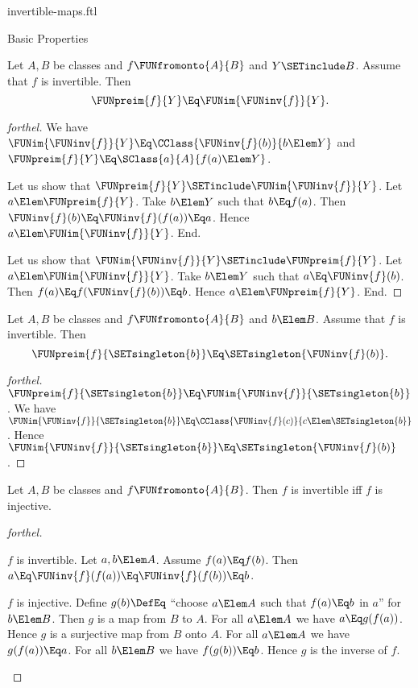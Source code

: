 \documentclass{stex}
\begin{document}
\begin{smodule}{invertible-maps.ftl}
\begin{sfragment}{Basic Properties}
  \begin{proposition}[forthel]
    Let $A, B$ be classes and $f \FUNfromonto{A}{B}$ and $Y \SETinclude B$.
    Assume that $f$ is invertible.
    Then \[ \FUNpreim{f}{Y} \Eq \FUNim{\FUNinv{f}}{Y}. \]
  \end{proposition}
  \begin{proof}[forthel]
    We have $\FUNim{\FUNinv{f}}{Y} \Eq \CClass{\FUNinv{f}(b)}{b \Elem Y}$ and $\FUNpreim{f}{Y} \Eq \SClass{a}{A}{f(a) \Elem Y}$.

    Let us show that $\FUNpreim{f}{Y} \SETinclude \FUNim{\FUNinv{f}}{Y}$.
      Let $a \Elem \FUNpreim{f}{Y}$.
      Take $b \Elem Y$ such that $b \Eq f(a)$.
      Then $\FUNinv{f}(b) \Eq \FUNinv{f}(f(a)) \Eq a$.
      Hence $a \Elem \FUNim{\FUNinv{f}}{Y}$.
    End.

    Let us show that $\FUNim{\FUNinv{f}}{Y} \SETinclude \FUNpreim{f}{Y}$.
      Let $a \Elem \FUNim{\FUNinv{f}}{Y}$.
      Take $b \Elem Y$ such that $a \Eq \FUNinv{f}(b)$.
      Then $f(a) \Eq f(\FUNinv{f}(b)) \Eq b$.
      Hence $a \Elem \FUNpreim{f}{Y}$.
    End.
  \end{proof}

  \begin{corollary}[forthel]
    Let $A, B$ be classes and $f \FUNfromonto{A}{B}$ and $b \Elem B$.
    Assume that $f$ is invertible.
    Then \[ \FUNpreim{f}{\SETsingleton{b}} \Eq \SETsingleton{\FUNinv{f}(b)}. \]
  \end{corollary}
  \begin{proof}[forthel]
    $\FUNpreim{f}{\SETsingleton{b}} \Eq \FUNim{\FUNinv{f}}{\SETsingleton{b}}$.
    We have $\FUNim{\FUNinv{f}}{\SETsingleton{b}} \Eq \CClass{\FUNinv{f}(c)}{c \Elem \SETsingleton{b}}$.
    Hence $\FUNim{\FUNinv{f}}{\SETsingleton{b}} \Eq \SETsingleton{\FUNinv{f}(b)}$.
  \end{proof}

  \begin{proposition}[forthel]
    Let $A, B$ be classes and $f \FUNfromonto{A}{B}$.
    Then $f$ is invertible iff $f$ is injective.
  \end{proposition}
  \begin{proof}[forthel]
    \begin{case}{$f$ is invertible.}
      Let $a, b \Elem A$.
      Assume $f(a) \Eq f(b)$.
      Then $a \Eq \FUNinv{f}(f(a)) \Eq \FUNinv{f}(f(b)) \Eq b$.
    \end{case}

    \begin{case}{$f$ is injective.}
      Define $g(b) \DefEq$ ``choose $a \Elem A$ such that $f(a) \Eq b$ in $a$'' for
      $b \Elem B$.
      Then $g$ is a map from $B$ to $A$.
      For all $a \Elem A$ we have $a \Eq g(f(a))$.
      Hence $g$ is a surjective map from $B$ onto $A$.
      For all $a \Elem A$ we have $g(f(a)) \Eq a$.
      For all $b \Elem B$ we have $f(g(b)) \Eq b$.
      Hence $g$ is the inverse of $f$.
    \end{case}
  \end{proof}


\end{sfragment}
\end{smodule}
\end{document}

